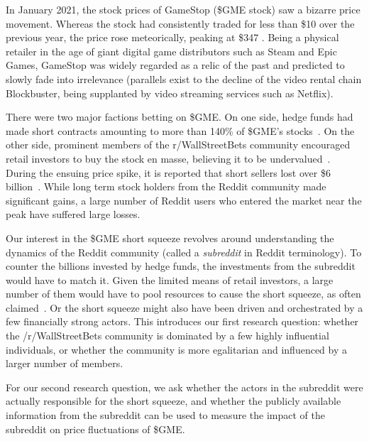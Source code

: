 \documentclass[noacm,sigconf,authorversion]{acmart}
\begin{document}
In January 2021, the stock prices of GameStop (\$GME stock) saw a bizarre price movement.
Whereas the stock had consistently traded for less than \$10 over the previous year, the 
price rose meteorically, peaking at \$347 \cite{umar2021tale}.
Being a physical retailer in the age of giant digital game distributors such as Steam and 
Epic Games, GameStop was widely regarded as a relic of the past and predicted to slowly 
fade into irrelevance (parallels exist to the decline of the video rental chain Blockbuster, being supplanted by video streaming services such as Netflix).

There were two major factions betting on \$GME. 
On one side, hedge funds had made short contracts amounting to more than 140\% of \$GME's stocks~\cite{shortlosses2021}.
On the other side, prominent members of the r/WallStreetBets community encouraged retail investors
to buy the stock en masse, believing it to be undervalued~\cite{chohan2021counter}. 
During the ensuing price spike, it is reported that short sellers lost over \$6 billion~\cite{shortlosses2021}. 
While long term stock holders from the Reddit community made significant gains, a large number 
of Reddit users who entered the market near the peak have suffered large losses.

Our interest in the \$GME short squeeze revolves around understanding the dynamics of the 
Reddit community (called a \emph{subreddit} in Reddit terminology). 
To counter the billions invested by hedge funds, the investments from the subreddit would 
have to match it. 
Given the limited means of retail investors, a large number of them would have to pool resources
to cause the short squeeze, as often claimed~\cite{chohan2021counter, umar2021tale}. Or the short squeeze might also have been driven and orchestrated by a few financially strong actors.
This introduces our first research question: whether the /r/WallStreetBets community is dominated 
by a few highly influential individuals, or whether the community is more egalitarian and 
influenced by a larger number of members.

For our second research question, we ask whether the actors in the subreddit were actually 
responsible for the short squeeze, and whether the publicly available information from the 
subreddit can be used to measure the impact of the subreddit on price fluctuations of \$GME.
\end{document}
